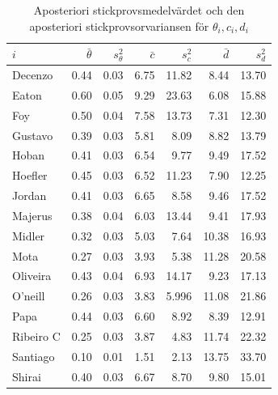 \documentclass{article}
\begin{document}
\begin{table}[h]
    \centering
    \caption{Aposteriori stickprovsmedelvärdet och den aposteriori stickprovsorvariansen för $\theta_i, c_i, d_i$}
    \label{tab:hierarkisk_params}
    \begin{tabular}{l|rr|rr|rr}
    \toprule
    $i$ & $\bar{\theta}$ & $s_{\theta}^2$ & $\bar{c}$ & $s_{c}^2$ & $\bar{d}$ & $s_{d}^2$ \\
    \midrule
    Decenzo   & 0.44 & 0.03 & 6.75 & 11.82 & 8.44 & 13.70 \\
    Eaton     & 0.60 & 0.05 & 9.29 & 23.63 & 6.08 & 15.88 \\
    Foy       & 0.50 & 0.04 & 7.58 & 13.73 & 7.31 & 12.30 \\
    Gustavo   & 0.39 & 0.03 & 5.81 & 8.09 & 8.82 & 13.79 \\
    Hoban     & 0.41 & 0.03 & 6.54 & 9.77 & 9.49 & 17.52 \\
    Hoefler   & 0.45 & 0.03 & 6.52 & 11.23 & 7.90 & 12.25 \\
    Jordan    & 0.41 & 0.03 & 6.65 & 8.58 & 9.46 & 17.52 \\
    Majerus   & 0.38 & 0.04 & 6.03 & 13.44 & 9.41 & 17.93 \\
    Midler    & 0.32 & 0.03 & 5.03 & 7.64 & 10.38 & 16.93 \\
    Mota      & 0.27 & 0.03 & 3.93 & 5.38 & 11.28 & 20.58 \\
    Oliveira  & 0.43 & 0.04 & 6.93 & 14.17 & 9.23 & 17.13 \\
    O’neill   & 0.26 & 0.03 & 3.83 & 5.996 & 11.08 & 21.86 \\
    Papa      & 0.44 & 0.03 & 6.60 & 8.92 & 8.39 & 12.91 \\
    Ribeiro C & 0.25 & 0.03 & 3.87 & 4.83 & 11.74 & 22.32 \\
    Santiago  & 0.10 & 0.01 & 1.51 & 2.13 & 13.75 & 33.70 \\
    Shirai    & 0.40 & 0.03 & 6.67 & 8.70 & 9.80 & 15.01 \\
    \bottomrule
    \end{tabular}
\end{table}
\end{document}
